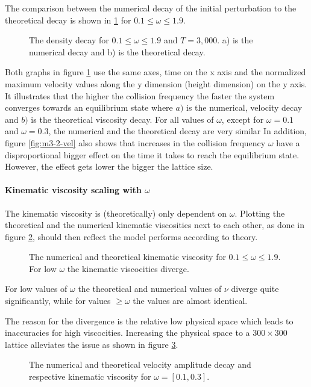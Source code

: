 The comparison between the numerical decay of the initial perturbation to the theoretical decay is shown in \ref{fig:m3-2-norm-vel} for $0.1 \leq \omega \leq 1.9 $.
\begin{figure}[ht]
\centering
\resizebox{0.9\columnwidth}{!}{\large}
\caption[Normalized density decay]{The density decay for $0.1 \leq \omega \leq 1.9 $ and $T=3,000$. a) is the numerical decay and b) is the theoretical decay.}
\label{fig:m3-2-norm-vel}
\end{figure}
Both graphs in figure \ref{fig:m3-2-norm-vel} use the same axes, time on the x axis and the normalized maximum velocity values along the y dimension (height dimension) on the y axis.
It illustrates that the higher the collision frequency the faster the system converges towards an equilibrium state where $a)$ is the numerical, velocity decay and $b)$ is the theoretical viscosity decay.
For all values of $\omega$, except for $\omega=0.1$ and $\omega=0.3$, the numerical and the theoretical decay are very similar
In addition, figure \ref{fig:m3-2-vel} also shows that increases in the collision frequency $\omega$ have a disproportional bigger effect on the time it takes to reach the equilibrium state. However, the effect gets lower the bigger the lattice size.


\paragraph{Kinematic viscosity scaling with $\omega$}
The kinematic viscosity is (theoretically) only dependent on $\omega$. 
Plotting the theoretical and the numerical kinematic viscosities next to each other, as done in figure \ref{fig:m3-3-kinematic-viscocity}, should then reflect the model performs according to theory. 
\begin{figure}[ht]
\centering
\resizebox{0.8\columnwidth}{!}{\large}
\caption[Kinematic viscosity]{The numerical and theoretical kinematic viscosity for $0.1 \leq \omega \leq 1.9 $. For low $\omega$ the kinematic viscocities diverge.}
\label{fig:m3-3-kinematic-viscocity}
\end{figure}
For low values of $\omega$ the theoretical and numerical values of $\nu$ diverge quite significantly, while for values $\geq\omega$ the values are almost identical.

The reason for the divergence is the relative low physical space which leads to inaccuracies for high viscocities. Increasing the physical space to a $300\times300$ lattice alleviates the issue as shown in figure \ref{fig:m3-3-update}.
\begin{figure}[ht]
\centering
\resizebox{\columnwidth}{!}{\large}
\caption[Kinematic viscosity]{The numerical and theoretical velocity amplitude decay and respective kinematic viscosity for $\omega=[0.1, 0.3] $.}
\label{fig:m3-3-update}
\end{figure}

